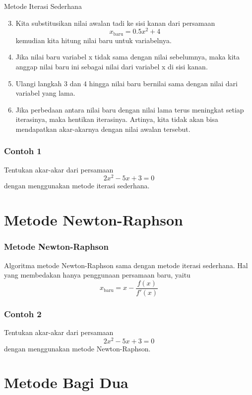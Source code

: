 \documentclass[pdflatex,compress]{beamer}
\begin{document}
\begin{frame}{Metode Iterasi Sederhana}
	\begin{enumerate}
		\setcounter{enumi}{2}
		\item Kita substitusikan nilai awalan tadi ke sisi kanan dari persamaan $$ x_{\text{baru}} = 0.5x^2 + 4 $$ kemudian kita hitung nilai baru untuk variabelnya.
		\item Jika nilai baru variabel x tidak sama dengan nilai sebelumnya, maka kita anggap nilai baru ini sebagai nilai dari variabel x di sisi kanan.
		\item Ulangi langkah 3 dan 4 hingga nilai baru bernilai sama dengan nilai dari variabel yang lama.
		\item Jika perbedaan antara nilai baru dengan nilai lama terus meningkat setiap iterasinya, maka hentikan iterasinya. Artinya, kita tidak akan bisa mendapatkan akar-akarnya dengan nilai awalan tersebut.
	\end{enumerate}
\end{frame}

\begin{frame}
	\frametitle{Contoh 1}
	Tentukan akar-akar dari persamaan $$ 2x^2 - 5x + 3 = 0 $$ dengan menggunakan metode iterasi sederhana.
\end{frame}

\section{Metode Newton-Raphson}

\begin{frame}
	\frametitle{Metode Newton-Raphson}
	Algoritma metode Newton-Raphson sama dengan metode iterasi sederhana. Hal yang membedakan hanya penggunaan persamaan baru, yaitu $$ x_{\text{baru}} = x - \frac{f(x)}{f'(x)} $$
\end{frame}

\begin{frame}
	\frametitle{Contoh 2}
	Tentukan akar-akar dari persamaan $$ 2x^2 - 5x + 3 = 0 $$ dengan menggunakan metode Newton-Raphson.
\end{frame}

\section{Metode Bagi Dua}
\end{document}

